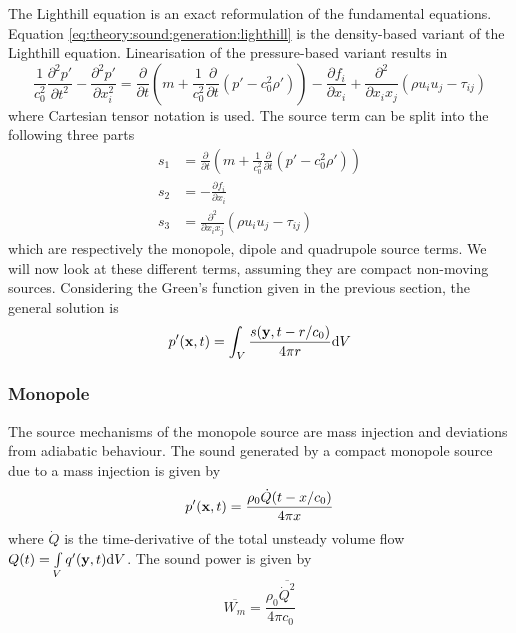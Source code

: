 The Lighthill equation is an exact reformulation of the fundamental equations.
Equation \eqref{eq:theory:sound:generation:lighthill} is the density-based
variant of the Lighthill equation. Linearisation of the pressure-based variant
results in
\begin{equation}
 \frac{1}{c_0^2}\frac{\partial^2 p'}{\partial t^2} - \frac{\partial^2 p'}{\partial x_i^2} = \frac{\partial}{\partial t} \left( m + \frac{1}{c_0^2}\frac{\partial}{\partial t}\left(p' - c_0^2 \rho' \right) \right) - \frac{\partial f_i}{\partial x_i} + \frac{\partial^2 }{\partial x_i x_j} \left( \rho u_i u_j - \tau_{ij} \right)
\end{equation}
where Cartesian tensor notation is used.
The source term can be split into the following three parts
\begin{align}
  s_1 &= \frac{\partial}{\partial t} \left( m + \frac{1}{c_0^2}\frac{\partial}{\partial t}\left(p' - c_0^2 \rho' \right) \right) \\
  s_2 &= - \frac{\partial f_i}{\partial x_i} \\
  s_3 &= \frac{\partial^2 }{\partial x_i x_j} \left( \rho u_i u_j - \tau_{ij} \right)
\end{align}
which are respectively the monopole, dipole and quadrupole source terms.
We will now look at these different terms, assuming they are compact non-moving sources.
Considering the Green's function given in the previous section, the general solution is
\begin{equation}
  p'(\mathbf{x}, t) = \int_V \frac{s(\mathbf{y}, t-r/c_0)}{4\pi r} \mathrm{d} V
\end{equation}

\subsubsection*{Monopole}
The source mechanisms of the monopole source are mass injection and deviations
from adiabatic behaviour. The sound generated by a compact monopole source due to a mass injection is given by
\begin{equation}
  p'(\mathbf{x}, t) = \frac{\rho_0 \dot{Q} (t-x/c_0)}{4 \pi x}
\end{equation}
where $\dot{Q}$ is the time-derivative of the total unsteady volume flow
$Q(t) = \int\limits_V q'(\mathbf{y},t) \mathrm{d}V$.
The sound power is given by
\begin{equation}
  \overline{W_m} = \frac{\rho_0 \overline{\dot{Q}^2}}{4 \pi c_0}
\end{equation}

